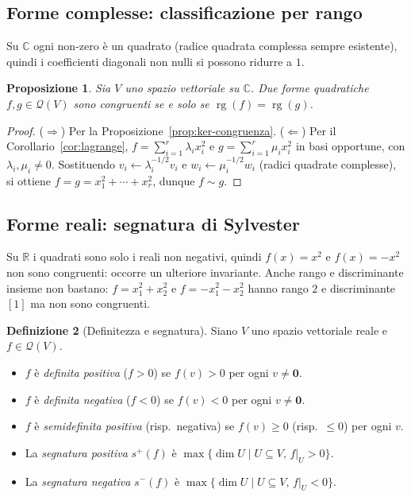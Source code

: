 \documentclass[11pt, a4paper]{book}
\theoremstyle{definition}
\newtheorem{definizione}{Definizione}[section]
\theoremstyle{plain}
\newtheorem{proposizione}[definizione]{Proposizione}
\theoremstyle{remark}
\newcommand{\R}{\mathbb{R}}
\newcommand{\C}{\mathbb{C}}
\DeclareMathOperator{\rg}{rg}
\begin{document}
\subsection{Forme complesse: classificazione per rango}

Su $\C$ ogni non-zero è un quadrato (radice quadrata complessa sempre esistente), quindi i coefficienti diagonali non nulli si possono ridurre a $1$.

\begin{proposizione}
\label{prop:class-complesse}
Sia $V$ uno spazio vettoriale su $\C$. Due forme quadratiche $f, g \in \mathcal{Q}(V)$ sono congruenti se e solo se $\rg(f) = \rg(g)$.
\end{proposizione}

\begin{proof}
($\Rightarrow$) Per la Proposizione~\ref{prop:ker-congruenza}. ($\Leftarrow$) Per il Corollario~\ref{cor:lagrange}, $f = \sum_{i=1}^r \lambda_i x_i^2$ e $g = \sum_{i=1}^r \mu_i x_i^2$ in basi opportune, con $\lambda_i, \mu_i \neq 0$. Sostituendo $v_i \leftarrow \lambda_i^{-1/2}v_i$ e $w_i \leftarrow \mu_i^{-1/2}w_i$ (radici quadrate complesse), si ottiene $f = g = x_1^2+\cdots+x_r^2$, dunque $f \sim g$.
\end{proof}

\subsection{Forme reali: segnatura di Sylvester}

Su $\R$ i quadrati sono solo i reali non negativi, quindi $f(x) = x^2$ e $f(x) = -x^2$ non sono congruenti: occorre un ulteriore invariante. Anche rango e discriminante insieme non bastano: $f = x_1^2+x_2^2$ e $f = -x_1^2-x_2^2$ hanno rango $2$ e discriminante $[1]$ ma non sono congruenti.

\begin{defbox}
\begin{definizione}[Definitezza e segnatura]
\label{def:segnatura}
Siano $V$ uno spazio vettoriale reale e $f \in \mathcal{Q}(V)$.
\begin{itemize}
  \item $f$ è \emph{definita positiva} ($f > 0$) se $f(v) > 0$ per ogni $v \neq \mathbf{0}$.
  \item $f$ è \emph{definita negativa} ($f < 0$) se $f(v) < 0$ per ogni $v \neq \mathbf{0}$.
  \item $f$ è \emph{semidefinita positiva} (risp.\ negativa) se $f(v) \geq 0$ (risp.\ $\leq 0$) per ogni $v$.
  \item La \emph{segnatura positiva} $s^+(f)$ è $\max\{\dim U \mid U \subseteq V,\,f|_U > 0\}$.
  \item La \emph{segnatura negativa} $s^-(f)$ è $\max\{\dim U \mid U \subseteq V,\,f|_U < 0\}$.
\end{itemize}
\end{definizione}
\end{defbox}
\end{document}
